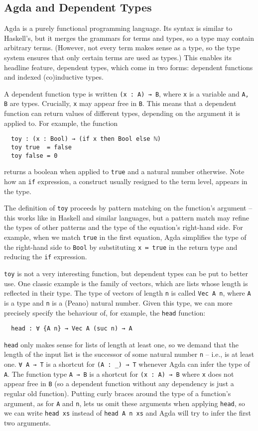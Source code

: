 \documentclass{scrartcl}
\newcommand*{\cod}[1]{\texttt{#1}}
\begin{document}
\subsection{Agda and Dependent Types}

Agda is a purely functional programming language. Its syntax is similar to
Haskell's, but it merges the grammars for terms and types, so a type may contain
arbitrary terms. (However, not every term makes sense as a type, so the type
system ensures that only certain terms are used as types.) This enables its
headline feature, dependent types, which come in two forms: dependent functions
and indexed (co)inductive types.

A dependent function type is written \cod{(x~:~A)~→~B}, where \cod{x} is a
variable and \cod{A, B} are types. Crucially, \cod{x} may appear free in
\cod{B}. This means that a dependent function can return values of different
types, depending on the argument it is applied to. For example, the function
\begin{verbatim}
  toy : (x : Bool) → (if x then Bool else ℕ)
  toy true  = false
  toy false = 0
\end{verbatim}
returns a boolean when applied to \cod{true} and a natural number otherwise.
Note how an \cod{if} expression, a construct usually resigned to the term
level, appears in the type.

The definition of \cod{toy} proceeds by pattern matching on the function's
argument -- this works like in Haskell and similar languages, but a pattern
match may refine the types of other patterns and the type of the equation's
right-hand side. For example, when we match \cod{true} in the first equation,
Agda simplifies the type of the right-hand side to \cod{Bool} by substituting
\cod{x~≔~true} in the return type and reducing the \cod{if} expression.

\cod{toy} is not a very interesting function, but dependent types can be put to
better use. One classic example is the family of vectors, which are lists whose
length is reflected in their type. The type of vectors of length \cod{n} is
called \cod{Vec~A~n}, where \cod{A} is a type and \cod{n} is a (Peano)
natural number. Given this type, we can more precisely specify the behaviour of,
for example, the \cod{head} function:
\begin{verbatim}
  head : ∀ {A n} → Vec A (suc n) → A
\end{verbatim}
\cod{head} only makes sense for lists of length at least one, so we demand that
the length of the input list is the successor of some natural number \cod{n} --
i.e., is at least one. \cod{∀~A~→~T} is a shortcut for \cod{(A~:~\_)~→~T}
whenever Agda can infer the type of \cod{A}. The function type \cod{A~→~B} is a
shortcut for \cod{(x~:~A)~→~B} where \cod{x} does not appear free in \cod{B} (so
a dependent function without any dependency is just a regular old function).
Putting curly braces around the type of a function's argument, as for \cod{A}
and \cod{n}, lets us omit these arguments when applying \cod{head}, so we can
write \cod{head~xs} instead of \cod{head~A~n~xs} and Agda will try to infer the
first two arguments.
\end{document}
